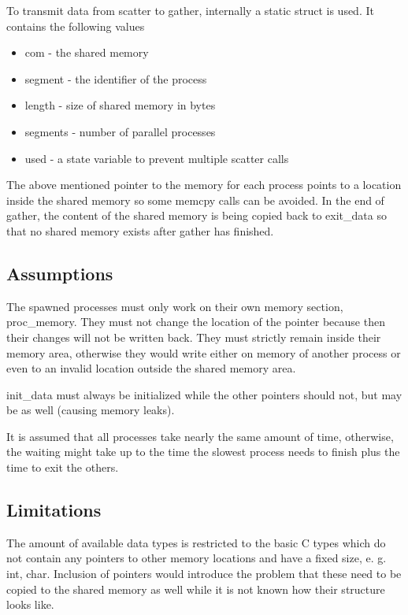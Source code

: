 \documentclass[a4paper]{article}
\begin{document}
To transmit data from scatter to gather, internally a static struct is used. It contains the following values

\begin{itemize}
    \item com - the shared memory
    \item segment - the identifier of the process
    \item length - size of shared memory in bytes
    \item segments - number of parallel processes
    \item used - a state variable to prevent multiple scatter calls
\end{itemize}

The above mentioned pointer to the memory for each process points to a location inside the shared memory so some memcpy calls can be avoided. In the end of gather, the content of the shared memory is being copied back to exit\_data so that no shared memory exists after gather has finished. 

\subsection{Assumptions}

The spawned processes must only work on their own memory section, proc\_memory. They must not change the location of the pointer because then their changes will not be written back. They must strictly remain inside their memory area, otherwise they would write either on memory of another process or even to an invalid location outside the shared memory area.  

init\_data must always be initialized while the other pointers should not, but may be as well (causing memory leaks).

It is assumed that all processes take nearly the same amount of time, otherwise, the waiting might take up to the time the slowest process needs to finish plus the time to exit the others.


\subsection{Limitations}

The amount of available data types is restricted to the basic C types which do not contain any pointers to other memory locations and have a fixed size, e. g. int, char. Inclusion of pointers would introduce the problem that these need to be copied to the shared memory as well while it is not known how their structure looks like.
\end{document}
